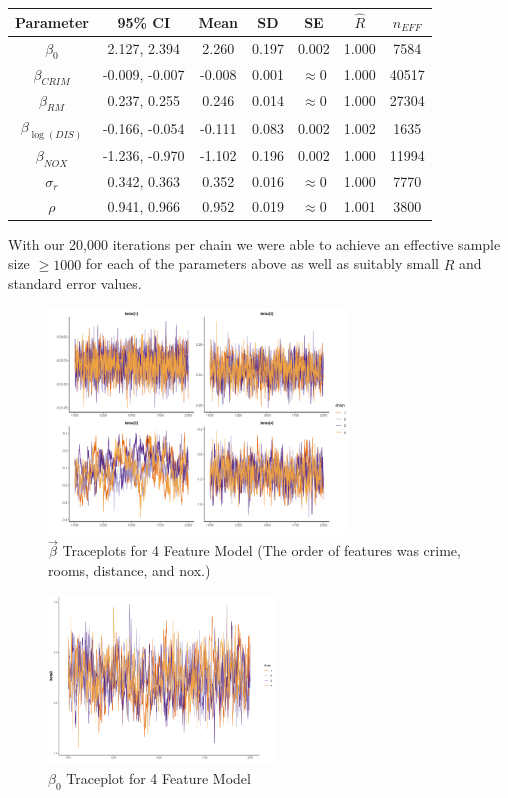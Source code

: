 \documentclass[11pt]{article}
\begin{document}
\begin{center}
\begin{tabular}{ c  | c | c | c | c | c | c}
\hline
 Parameter & 95\% CI & Mean & SD & SE & $\hat{R}$ & $n_{EFF}$ \\ 
 \hline
 $\beta_0$ & 2.127, 2.394 & 2.260 & 0.197 & 0.002 & 1.000 & 7584 \\
 $\beta_{CRIM}$ & -0.009, -0.007 & -0.008 & 0.001 & $\approx 0$ & 1.000 & 40517  \\
 $\beta_{RM}$ & 0.237, 0.255 & 0.246 & 0.014 & $\approx 0$  & 1.000 & 27304 \\
 $\beta_{\log{(DIS)}}$ & -0.166, -0.054 & -0.111 & 0.083 & 0.002 & 1.002 & 1635 \\
 $\beta_{NOX}$ & -1.236, -0.970 & -1.102 & 0.196 & 0.002 & 1.000 & 11994 \\
 $\sigma_r$ & 0.342, 0.363 & 0.352 & 0.016 & $\approx 0$ & 1.000 & 7770 \\
$\rho$ & 0.941, 0.966 & 0.952 & 0.019 & $\approx 0$ & 1.001 & 3800 \\
\hline
\end{tabular}
\end{center}

With our 20,000 iterations per chain we were able to achieve an effective sample size $\geq 1000$ for each of the parameters above as well as suitably small $\hat{R}$ and standard error values. 

\begin{figure}[h!] 
	\centering
  \includegraphics[height=60mm]{traceplot_betas.png}
  \caption{$\vec{\beta}$ Traceplots for 4 Feature Model (The order of features was crime, rooms, distance, and nox.)}
  \label{fig:tbetas}
\end{figure}

\begin{figure}[h!] 
	\centering
  \includegraphics[height=45mm]{traceplot_beta0.png}
  \caption{$\beta_0$ Traceplot for 4 Feature Model}
  \label{fig:tbeta0}
\end{figure}
\end{document}

